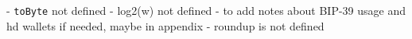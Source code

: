 - \texttt{toByte} not defined
- log2(w) not defined
- to add notes about BIP-39 usage and hd wallets if needed, maybe in appendix
- roundup is not defined